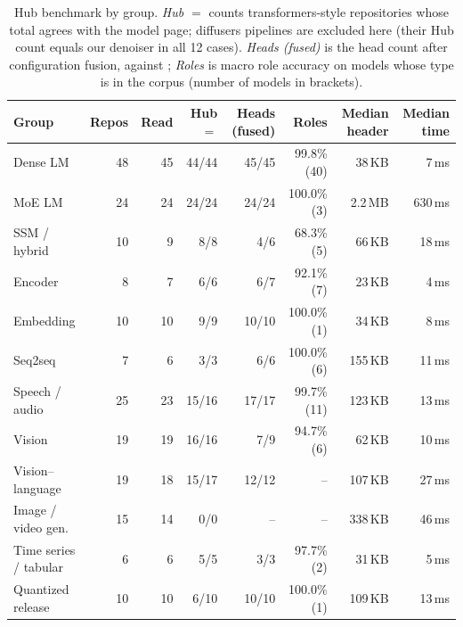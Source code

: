 \begin{table}[t]
\centering
\small
\begin{tabular}{lrrrrrrr}
\toprule
Group & Repos & Read & Hub $=$ & Heads (fused) & Roles & Median header & Median time \\
\midrule
Dense LM & 48 & 45 & 44/44 & 45/45 & 99.8\% (40) & 38\,KB & 7\,ms \\
MoE LM & 24 & 24 & 24/24 & 24/24 & 100.0\% (3) & 2.2\,MB & 630\,ms \\
SSM / hybrid & 10 & 9 & 8/8 & 4/6 & 68.3\% (5) & 66\,KB & 18\,ms \\
Encoder & 8 & 7 & 6/6 & 6/7 & 92.1\% (7) & 23\,KB & 4\,ms \\
Embedding & 10 & 10 & 9/9 & 10/10 & 100.0\% (1) & 34\,KB & 8\,ms \\
Seq2seq & 7 & 6 & 3/3 & 6/6 & 100.0\% (6) & 155\,KB & 11\,ms \\
Speech / audio & 25 & 23 & 15/16 & 17/17 & 99.7\% (11) & 123\,KB & 13\,ms \\
Vision & 19 & 19 & 16/16 & 7/9 & 94.7\% (6) & 62\,KB & 10\,ms \\
Vision--language & 19 & 18 & 15/17 & 12/12 & -- & 107\,KB & 27\,ms \\
Image / video gen. & 15 & 14 & 0/0 & -- & -- & 338\,KB & 46\,ms \\
Time series / tabular & 6 & 6 & 5/5 & 3/3 & 97.7\% (2) & 31\,KB & 5\,ms \\
Quantized release & 10 & 10 & 6/10 & 10/10 & 100.0\% (1) & 109\,KB & 13\,ms \\
\bottomrule
\end{tabular}
\caption{Hub benchmark by group. \emph{Hub $=$} counts transformers-style repositories whose total agrees with the model page; diffusers pipelines are excluded here (their Hub count equals our denoiser in all 12 cases). \emph{Heads (fused)} is the head count after configuration fusion, against ; \emph{Roles} is macro role accuracy on models whose type is in the corpus (number of models in brackets).}
\label{tab:hub-groups}
\end{table}
